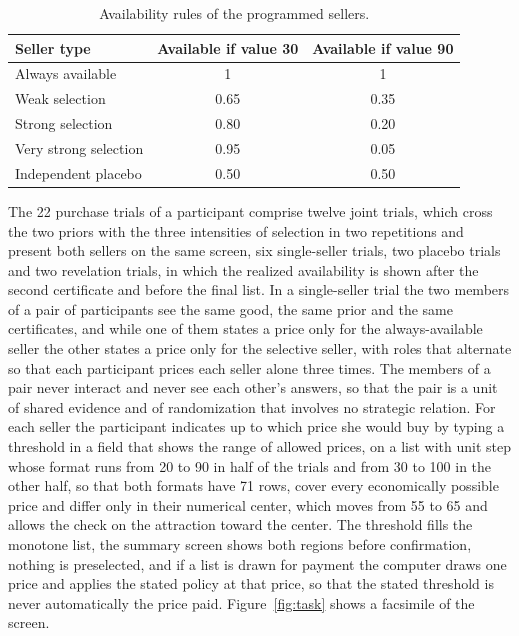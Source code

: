 \documentclass[11pt,a4paper]{article}
\begin{document}
\begin{table}[H]
\centering
\begin{tabular}{lcc}
\toprule
Seller type & Available if value 30 & Available if value 90\\
\midrule
Always available & 1 & 1\\
Weak selection & 0.65 & 0.35\\
Strong selection & 0.80 & 0.20\\
Very strong selection & 0.95 & 0.05\\
Independent placebo & 0.50 & 0.50\\
\bottomrule
\end{tabular}
\caption{Availability rules of the programmed sellers.}
\label{tab:sellers}
\end{table}

The 22 purchase trials of a participant comprise twelve joint trials, which cross the two priors with the three intensities of selection in two repetitions and present both sellers on the same screen, six single-seller trials, two placebo trials and two revelation trials, in which the realized availability is shown after the second certificate and before the final list. In a single-seller trial the two members of a pair of participants see the same good, the same prior and the same certificates, and while one of them states a price only for the always-available seller the other states a price only for the selective seller, with roles that alternate so that each participant prices each seller alone three times. The members of a pair never interact and never see each other's answers, so that the pair is a unit of shared evidence and of randomization that involves no strategic relation. For each seller the participant indicates up to which price she would buy by typing a threshold in a field that shows the range of allowed prices, on a list with unit step whose format runs from 20 to 90 in half of the trials and from 30 to 100 in the other half, so that both formats have 71 rows, cover every economically possible price and differ only in their numerical center, which moves from 55 to 65 and allows the check on the attraction toward the center. The threshold fills the monotone list, the summary screen shows both regions before confirmation, nothing is preselected, and if a list is drawn for payment the computer draws one price and applies the stated policy at that price, so that the stated threshold is never automatically the price paid. Figure~\ref{fig:task} shows a facsimile of the screen.
\end{document}
